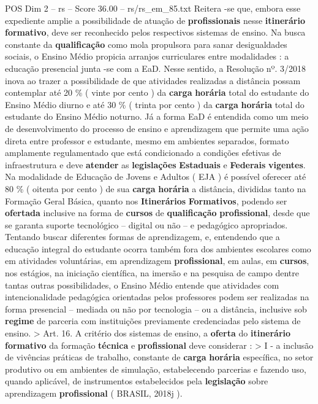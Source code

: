 \begin{textsample}{POS Dim 2 – rs – Score 36.00 – rs/rs\_em\_85.txt}
Reitera -se que, embora esse expediente amplie a possibilidade de atuação de \textbf{profissionais} nesse \textbf{itinerário} \textbf{formativo}, deve ser reconhecido pelos respectivos sistemas de ensino.
Na busca constante da \textbf{qualificação} como mola propulsora para sanar desigualdades sociais, o Ensino Médio propicia arranjos curriculares entre modalidades : a educação presencial junta -se com a EaD.
Nesse sentido, a Resolução nº. 3/2018 inova ao trazer a possibilidade de que atividades realizadas a distância possam contemplar até 20 \% ( vinte por cento ) da \textbf{carga} \textbf{horária} total do estudante do Ensino Médio diurno e até 30 \% ( trinta por cento ) da \textbf{carga} \textbf{horária} total do estudante do Ensino Médio noturno.
Já a forma EaD é entendida como um meio de desenvolvimento do processo de ensino e aprendizagem que permite uma ação direta entre professor e estudante, mesmo em ambientes separados, formato amplamente regulamentado que está condicionado a condições efetivas de infraestrutura e deve \textbf{atender} as \textbf{legislações} \textbf{Estaduais} e \textbf{Federais} \textbf{vigentes}.
Na modalidade de Educação de Jovens e Adultos ( EJA ) é possível oferecer até 80 \% ( oitenta por cento ) de sua \textbf{carga} \textbf{horária} a distância, divididas tanto na Formação Geral Básica, quanto nos \textbf{Itinerários} \textbf{Formativos}, podendo ser \textbf{ofertada} inclusive na forma de \textbf{cursos} de \textbf{qualificação} \textbf{profissional}, desde que se garanta suporte tecnológico – digital ou não – e pedagógico apropriados.
Tentando buscar diferentes formas de aprendizagem, e, entendendo que a educação integral do estudante ocorra também fora dos ambientes escolares como em atividades voluntárias, em aprendizagem \textbf{profissional}, em aulas, em \textbf{cursos}, nos estágios, na iniciação científica, na imersão e na pesquisa de campo dentre tantas outras possibilidades, o Ensino Médio entende que atividades com intencionalidade pedagógica orientadas pelos professores podem ser realizadas na forma presencial – mediada ou não por tecnologia – ou a distância, inclusive sob \textbf{regime} de parceria com instituições previamente credenciadas pelo sistema de ensino. > Art. 16.
A critério dos sistemas de ensino, a \textbf{oferta} do \textbf{itinerário} \textbf{formativo} da formação \textbf{técnica} e \textbf{profissional} deve considerar : > I - a inclusão de vivências práticas de trabalho, constante de \textbf{carga} \textbf{horária} específica, no setor produtivo ou em ambientes de simulação, estabelecendo parcerias e fazendo uso, quando aplicável, de instrumentos estabelecidos pela \textbf{legislação} sobre aprendizagem \textbf{profissional} ( BRASIL, 2018j ).

\end{textsample}
